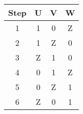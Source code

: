 \begin{tabular}{c|c c c}
	\hline
	Step & U & V & W \\
	\hline
	1 & 1 & 0 & Z \\
	2 & 1 & Z & 0 \\
	3 & Z & 1 & 0 \\
	4 & 0 & 1 & Z \\
	5 & 0 & Z & 1 \\
	6 & Z & 0 & 1 \\
	\hline
\end{tabular}